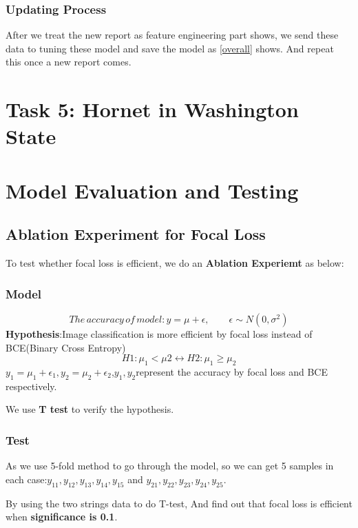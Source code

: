 \documentclass[12pt]{article}
\begin{document}
\subsubsection{Updating Process}
After we treat the new report as feature engineering part shows, we send these data to tuning these model and save the model as \ref{overall} shows. And repeat this once a new report comes.



\section{Task 5: Hornet in Washington State}



\section{Model Evaluation and Testing}
\subsection{Ablation Experiment for Focal Loss }
To test whether focal loss is efficient, we do an \textbf{Ablation Experiemt }as below:
\subsubsection{Model}
\begin{equation*}
The\,accuracy\,of\,model:y=\mu+\epsilon,\qquad \epsilon\sim N(0,\sigma^2)
\end{equation*}
\textbf{Hypothesis}:Image classification is more efficient by focal loss instead of BCE(Binary Cross Entropy)
\begin{equation*}
H1:\mu_1<\mu2\leftrightarrow H2:\mu_1\geq \mu_2
\end{equation*}
$y_1=\mu_1+\epsilon_1,y_2=\mu_2+\epsilon_2$,$y_1,y_2$represent the accuracy by focal loss and BCE respectively.

We use \textbf{T test} to verify the hypothesis.
\subsubsection{Test}
As we use 5-fold method to go through the model, so we can get 5 samples in each case:$y_{11},y_{12},y_{13},y_{14},y_{15}$ and $y_{21},y_{22},y_{23},y_{24},y_{25}$.

By using the two strings data to do T-test, And find out that focal loss is efficient when \textbf{significance is 0.1}.
\end{document}
